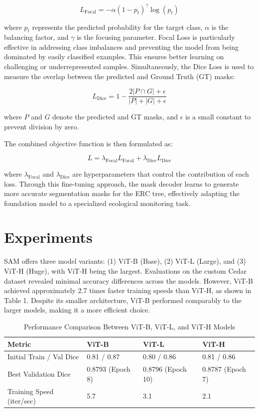 \documentclass[letterpaper, 10 pt, conference]{ieeeconf}  %
\begin{document}
\[
L_{\text{Focal}} = - \alpha (1 - p_t)^{\gamma} \log(p_t)
\]

where \( p_t \) represents the predicted probability for the target class, \( \alpha \) is the balancing factor, and \( \gamma \) is the focusing parameter. Focal Loss is particularly effective in addressing class imbalances and preventing the model from being dominated by easily classified examples. This ensures better learning on challenging or underrepresented samples. Simultaneously, the Dice Loss is used to measure the overlap between the predicted and Ground Truth (GT) masks:

\[
L_{\text{Dice}} = 1 - \frac{2 |P \cap G| + \epsilon}{|P| + |G| + \epsilon}
\]

where \( P \) and \( G \) denote the predicted and GT masks, and \( \epsilon \) is a small constant to prevent division by zero.

The combined objective function is then formulated as:

\[
L = \lambda_{\text{Focal}} L_{\text{Focal}} + \lambda_{\text{Dice}} L_{\text{Dice}}
\]

where \( \lambda_{\text{Focal}} \) and \( \lambda_{\text{Dice}} \) are hyperparameters that control the contribution of each loss. Through this fine-tuning approach, the mask decoder learns to generate more accurate segmentation masks for the ERC tree, effectively adapting the foundation model to a specialized ecological monitoring task.


\section{Experiments}

SAM offers three model variants: (1) ViT-B (Base), (2) ViT-L (Large), and (3) ViT-H (Huge), with ViT-H being the largest. Evaluations on the custom Cedar dataset revealed minimal accuracy differences across the models. However, ViT-B achieved approximately 2.7 times faster training speeds than ViT-H, as shown in Table 1. Despite its smaller architecture, ViT-B performed comparably to the larger models, making it a more efficient choice.

\begin{table}[h]
\caption{Performance Comparison Between ViT-B, ViT-L, and ViT-H Models}
\label{table:sam_comparison}
\begin{center}
\begin{tabular}{|p{1.8cm}||p{1.5cm}|p{1.5cm}|p{1.5cm}|}

\hline
\textbf{Metric} & \textbf{ViT-B} & \textbf{ViT-L} & \textbf{ViT-H} \\
\hline
Initial Train / Val Dice & 0.81 / 0.87 & 0.80 / 0.86 & 0.81 / 0.86 \\
\hline
Best Validation Dice & 0.8793 (Epoch 8) & 0.8796 (Epoch 10) & 0.8787 (Epoch 7) \\
\hline
Training Speed (iter/sec) & 5.7 & 3.1 & 2.1 \\
\hline
\end{tabular}
\end{center}
\end{table}
\end{document}
